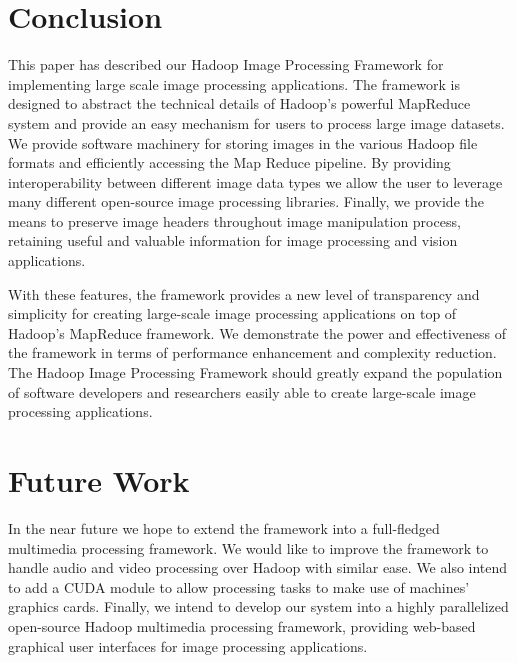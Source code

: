 \documentclass[conference]{IEEEtran}
\begin{document}
\section{Conclusion}
This paper has described our Hadoop Image Processing Framework for
implementing large scale image processing applications.  The framework
is designed to abstract the technical details of Hadoop's powerful
MapReduce system and provide an easy mechanism for users to process
large image datasets. We provide software machinery for storing images
in the various Hadoop file formats and efficiently accessing the Map
Reduce pipeline.  By providing interoperability between different
image data types we allow the user to leverage many different
open-source image processing libraries. Finally, we provide the means
to preserve image headers throughout image manipulation process,
retaining useful and valuable information for image processing and
vision applications.

With these features, the framework provides a new level of
transparency and simplicity for creating large-scale image processing
applications on top of Hadoop's MapReduce framework.  We demonstrate
the power and effectiveness of the framework in terms of performance
enhancement and complexity reduction.  The Hadoop Image Processing
Framework should greatly expand the population of software developers
and researchers easily able to create large-scale image processing
applications.

\section{Future Work}
In the near future we hope to extend the framework into a full-fledged
multimedia processing framework. We would like to improve the
framework to handle audio and video processing over Hadoop with
similar ease. We also intend to add a CUDA module to allow processing
tasks to make use of machines' graphics cards. Finally, we intend to
develop our system into a highly parallelized open-source Hadoop
multimedia processing framework, providing web-based graphical user
interfaces for image processing applications.



\end{document}
